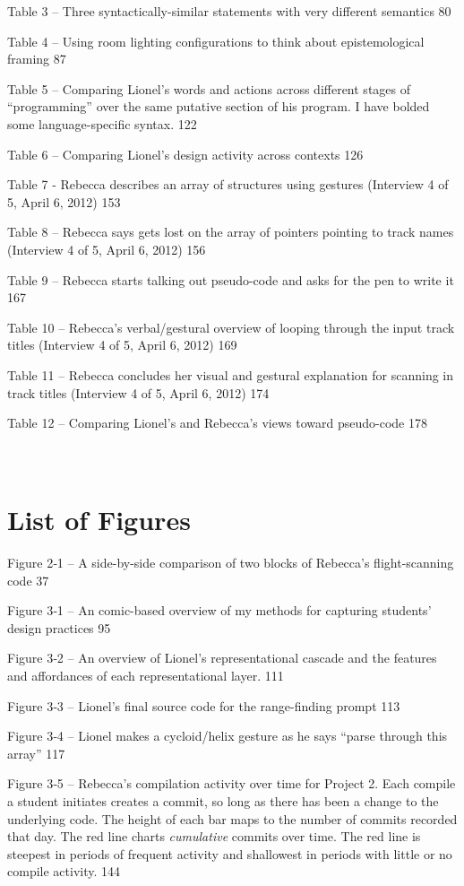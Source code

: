 Table 3 -- Three syntactically-similar statements with very different
semantics 80

Table 4 -- Using room lighting configurations to think about
epistemological framing 87

Table 5 -- Comparing Lionel's words and actions across different stages
of ``programming'' over the same putative section of his program. I have
bolded some language-specific syntax. 122

Table 6 -- Comparing Lionel's design activity across contexts 126

Table 7 - Rebecca describes an array of structures using gestures
(Interview 4 of 5, April 6, 2012) 153

Table 8 -- Rebecca says gets lost on the array of pointers pointing to
track names (Interview 4 of 5, April 6, 2012) 156

Table 9 -- Rebecca starts talking out pseudo-code and asks for the pen
to write it 167

Table 10 -- Rebecca's verbal/gestural overview of looping through the
input track titles (Interview 4 of 5, April 6, 2012) 169

Table 11 -- Rebecca concludes her visual and gestural explanation for
scanning in track titles (Interview 4 of 5, April 6, 2012) 174

Table 12 -- Comparing Lionel's and Rebecca's views toward pseudo-code
178

\section{\texorpdfstring{\\
List of Figures}{ List of Figures}}\label{list-of-figures}

Figure 2‑1 -- A side-by-side comparison of two blocks of Rebecca's
flight-scanning code 37

Figure 3‑1 -- An comic-based overview of my methods for capturing
students' design practices 95

Figure 3‑2 -- An overview of Lionel's representational cascade and the
features and affordances of each representational layer. 111

Figure 3‑3 -- Lionel's final source code for the range-finding prompt
113

Figure 3‑4 -- Lionel makes a cycloid/helix gesture as he says ``parse
through this array'' 117

Figure 3‑5 -- Rebecca's compilation activity over time for Project 2.
Each compile a student initiates creates a commit, so long as there has
been a change to the underlying code. The height of each bar maps to the
number of commits recorded that day. The red line charts
\emph{cumulative} commits over time. The red line is steepest in periods
of frequent activity and shallowest in periods with little or no compile
activity. 144

